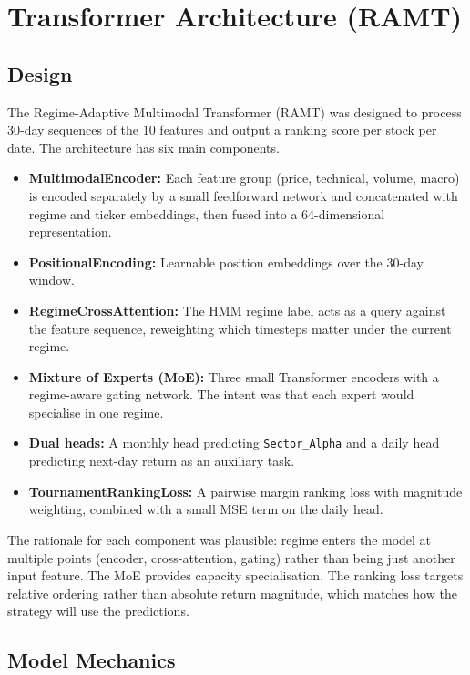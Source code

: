 \documentclass[conference]{IEEEtran}
\begin{document}
\section{Transformer Architecture (RAMT)}

\subsection{Design}

The Regime-Adaptive Multimodal Transformer (RAMT) was designed to process 30-day sequences of the 10 features and output a ranking score per stock per date. The architecture has six main components.

\begin{itemize}
    \item \textbf{MultimodalEncoder:} Each feature group (price, technical, volume, macro) is encoded separately by a small feedforward network and concatenated with regime and ticker embeddings, then fused into a 64-dimensional representation.
    \item \textbf{PositionalEncoding:} Learnable position embeddings over the 30-day window.
    \item \textbf{RegimeCrossAttention:} The HMM regime label acts as a query against the feature sequence, reweighting which timesteps matter under the current regime.
    \item \textbf{Mixture of Experts (MoE):} Three small Transformer encoders with a regime-aware gating network. The intent was that each expert would specialise in one regime.
    \item \textbf{Dual heads:} A monthly head predicting \texttt{Sector\_Alpha} and a daily head predicting next-day return as an auxiliary task.
    \item \textbf{TournamentRankingLoss:} A pairwise margin ranking loss with magnitude weighting, combined with a small MSE term on the daily head.
\end{itemize}

The rationale for each component was plausible: regime enters the model at multiple points (encoder, cross-attention, gating) rather than being just another input feature. The MoE provides capacity specialisation. The ranking loss targets relative ordering rather than absolute return magnitude, which matches how the strategy will use the predictions.

\subsection{Model Mechanics}
\end{document}
